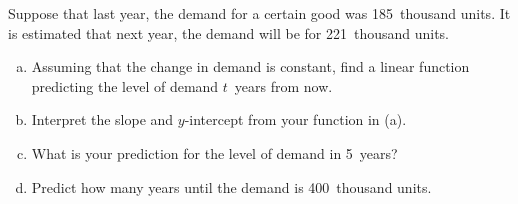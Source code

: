 \documentclass[11pt,letterpaper]{article}
\begin{document}
\newpage



 Suppose that last year, the demand for a certain good was 185~thousand units. It is estimated that next year, the demand will be for 221~thousand units. 
	\begin{enumerate}[(a)]
	\item Assuming that the change in demand is constant, find a linear function predicting the level of demand $t$~years from now.
	\item Interpret the slope and $y$-intercept from your function in (a).
	\item What is your prediction for the level of demand in 5~years?
	\item Predict how many years until the demand is 400~thousand units. 
	\end{enumerate} \pspace
\end{document}
